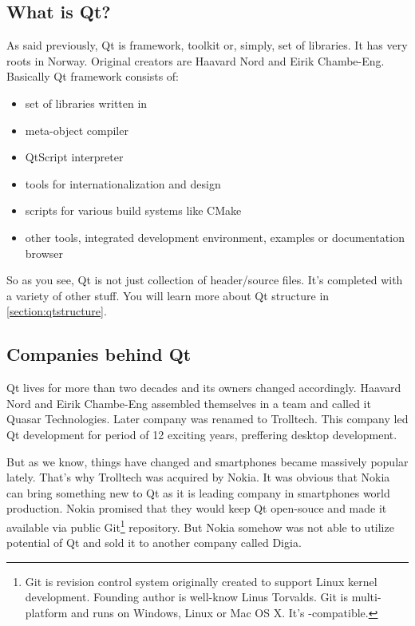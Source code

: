 \subsection{What is Qt?}
As said previously, Qt is framework, toolkit or, simply, set of libraries. It has very roots in Norway. Original creators are Haavard Nord and Eirik Chambe-Eng. Basically Qt framework consists of:
\begin{itemize}
\item set of libraries written in \cpp
\item meta-object compiler
\item QtScript interpreter
\item tools for internationalization and  design
\item scripts for various build systems like CMake
\item other tools, \eg integrated development environment, examples or documentation browser
\end{itemize}

So as you see, Qt is not just collection of header/source files. It's completed with a variety of other stuff. You will learn more about Qt structure in \autoref{section:qtstructure}.

\subsection{Companies behind Qt}
Qt lives for more than two decades and its owners changed accordingly. Haavard Nord and Eirik Chambe-Eng assembled themselves in a team and called it Quasar Technologies. Later company was renamed to Trolltech. This company led Qt development for period of 12 exciting years, preffering desktop development.


But as we know, things have changed and smartphones became massively popular lately. That's why Trolltech was acquired by Nokia. It was obvious that Nokia can bring something new to Qt as it is leading company in smartphones world production. Nokia promised that they would keep Qt open-souce and made it available via public Git\footnote{Git is revision control system originally created to support Linux kernel development. Founding author is well-know Linus Torvalds. Git is multi-platform and runs on Windows, Linux or Mac OS X. It's -compatible.} repository. But Nokia somehow was not able to utilize potential of Qt and sold it to another company called Digia.

